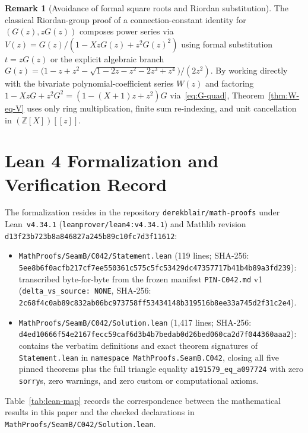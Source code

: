 \documentclass[11pt]{article}
\newcommand{\llbracket}{[\![}
\newcommand{\rrbracket}{]\!]}
\theoremstyle{definition}
\newtheorem{remark}[theorem]{Remark}
\newcommand{\Z}{\mathbb{Z}}
\begin{document}
\begin{remark}[Avoidance of formal square roots and Riordan substitution]
The classical Riordan-group proof of a connection-constant identity for $(G(z), z G(z))$ composes power series via $V(z) = G(z) / (1 - X z G(z) + z^2 G(z)^2)$ using formal substitution $t = z G(z)$ or the explicit algebraic branch $G(z) = \bigl(1 - z + z^2 - \sqrt{1 - 2z - z^2 - 2z^3 + z^4}\bigr)/(2z^2)$. By working directly with the bivariate polynomial-coefficient series $W(z)$ and factoring $1 - X z G + z^2 G^2 = (1 - (X+1)z + z^2)G$ via~\eqref{eq:G-quad}, Theorem~\ref{thm:W-eq-V} uses only ring multiplication, finite sum re-indexing, and unit cancellation in $(\Z[X])\llbracket z \rrbracket$.
\end{remark}

\section{Lean 4 Formalization and Verification Record}

The formalization resides in the repository \texttt{derekblair/math-proofs} under Lean~\texttt{v4.34.1} (\nolinkurl{leanprover/lean4:v4.34.1}) and Mathlib revision
{\small\nolinkurl{d13f23b723b8a846827a245b89c10fc7d3f11612}}:
\begin{itemize}
\item \nolinkurl{MathProofs/SeamB/C042/Statement.lean} (119 lines; SHA-256:\\
{\small\nolinkurl{5ee8b6f0acfb217cf7ee550361c575c5fc53429dc47357717b41b4b89a3fd239}}):\\
transcribed byte-for-byte from the frozen manifest \texttt{PIN-C042.md} v1 (\texttt{delta\_vs\_source: NONE}, SHA-256:\\
{\small\nolinkurl{2c68f4c0ab89c832ab06bc973758ff53434148b319516b8ee33a745d2f31c2e4}}).
\item \nolinkurl{MathProofs/SeamB/C042/Solution.lean} (1{,}417 lines; SHA-256:\\
{\small\nolinkurl{d4ed10666f54e2167fecc59caf6d3b4b7bedab0d26bed060ca2d7f044360aaa2}}):\\
contains the verbatim definitions and exact theorem signatures of \texttt{Statement.lean} in \nolinkurl{namespace MathProofs.SeamB.C042}, closing all five pinned theorems plus the full triangle equality \texttt{a191579\_eq\_a097724} with zero \texttt{sorry}s, zero warnings, and zero custom or computational axioms.
\end{itemize}

Table~\ref{tab:lean-map} records the correspondence between the mathematical results in this paper and the checked declarations in \nolinkurl{MathProofs/SeamB/C042/Solution.lean}.
\end{document}
